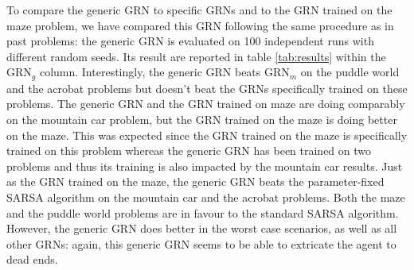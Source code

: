 To compare the generic GRN to specific GRNs and to the GRN trained on the maze problem, we have compared this GRN following the same procedure as in past problems: the generic GRN is evaluated on 100 independent runs with different random seeds. Its result are reported in table \ref{tab:results} within the GRN$_g$ column. Interestingly, the generic GRN beats GRN$_m$ on the puddle world and the acrobat problems but doesn't beat the GRNs specifically trained on these problems. The generic GRN and the GRN trained on maze are doing comparably on the mountain car problem, but the GRN trained on the maze is doing better on the maze. This was expected since the GRN trained on the maze is specifically trained on this problem whereas the generic GRN has been trained on two problems and thus its training is also impacted by the mountain car results. Just as the GRN trained on the maze, the generic GRN beats the parameter-fixed SARSA algorithm on the mountain car and the acrobat problems. Both the maze and the puddle world problems are in favour to the standard SARSA algorithm. However, the generic GRN does better in the worst case scenarios, as well as all other GRNs: again, this generic GRN seems to be able to extricate the agent to dead ends.


